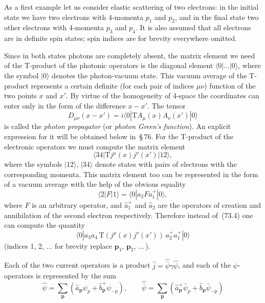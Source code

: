 As a first example let us consider elastic scattering of two electrons: in the initial state we have two electrons with 4-momenta $p_1$ and $p_2$, and in the final state two other electrons with 4-momenta $p_3$ and $p_4$. It is also assumed that all electrons are in definite spin states; spin indices are for brevity everywhere omitted.

Since in both states photons are completely absent, the matrix element we need of the T-product of the photonic operators is the diagonal element $\langle 0|\ldots|0\rangle$, where the symbol $|0\rangle$ denotes the photon-vacuum state. This vacuum average of the T-product represents a certain definite (for each pair of indices $\mu\nu$) function of the two points $x$ and $x'$. By virtue of the homogeneity of 4-space the coordinates can enter only in the form of the difference $x - x'$. The tensor
\begin{equation}
D_{\mu\nu}(x - x') = i\langle 0|\mathrm{T}A_\mu(x)A_\nu(x')|0\rangle
\tag{73.3}
\end{equation}
is called the \textit{photon propagator} (or \textit{photon Green's function}). An explicit expression for it will be obtained below in~\S\,76. For the T-product of the electronic operators we must compute the matrix element
\begin{equation}
\langle 34|\mathrm{T}j^\mu(x)j^\nu(x')|12\rangle,
\tag{73.4}
\end{equation}
where the symbols $|12\rangle$, $|34\rangle$ denote states with pairs of electrons with the corresponding momenta. This matrix element too can be represented in the form of a vacuum average with the help of the obvious equality
\[
\langle 2|F|1\rangle = \langle 0|a_2 F a_1^+|0\rangle,
\]
where $F$ is an arbitrary operator, and $\hat{a}_1^+$ and $\hat{a}_2$ are the operators of creation and annihilation of the second electron respectively. Therefore instead of~(73.4) one can compute the quantity
\begin{equation}
\langle 0|a_3 a_4\,\mathrm{T}(j^\mu(x)j^\nu(x'))\,a_2^+ a_1^+|0\rangle
\tag{73.5}
\end{equation}
(indices 1, 2, $\ldots$ for brevity replace $\mathbf{p}_1$, $\mathbf{p}_2$, $\ldots$\,).

Each of the two current operators is a product $\hat{j} = \hat{\bar{\psi}}\gamma\hat{\psi}$, and each of the $\psi$-operators is represented by the sum
\begin{equation}
\hat{\psi} = \sum_\mathbf{p}(\hat{a}_\mathbf{p}\psi_p + \hat{b}_\mathbf{p}^+\psi_{-p}),\qquad \hat{\bar{\psi}} = \sum_\mathbf{p}(\hat{a}_\mathbf{p}^+\bar{\psi}_p + \hat{b}_\mathbf{p}\bar{\psi}_{-p})
\tag{73.6}
\end{equation}

